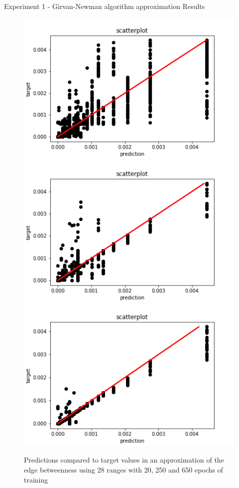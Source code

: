 \documentclass[xcolor=table]{beamer}
\begin{document}
\begin{frame}{Experiment 1 - Girvan-Newman algorithm approximation }{ Results}


\begin{figure}[H]
%
  \centering
    \includegraphics[width=0.9\linewidth]{img/GN_exp1/28bins/scatter_plot_20epochs.png}
\endminipage
{}%
  \centering
    \includegraphics[width=0.9\linewidth]{img/GN_exp1/28bins/scatter_plot_250epochs.png}
\endminipage
{}%
  \centering
    \includegraphics[width=0.9\linewidth]{img/GN_exp1/28bins/scatter_plot_600epochs.png}
\endminipage
\caption{Predictions compared to target values in an approximation of the edge betweenness using 28 ranges with 20, 250 and 650 epochs of training}\label{fig:edgeb_exp1_20bins}
\end{figure}

\end{frame}
\end{document}
